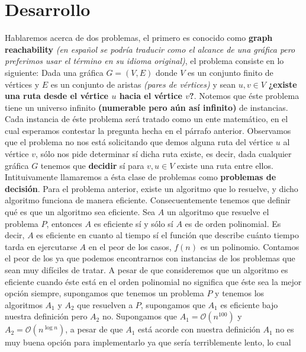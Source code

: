 \documentclass{article}
\begin{document}
\section{Desarrollo}
\noindent
Hablaremos acerca de dos problemas, el primero es conocido como \textbf{graph reachability} \textit{(en español se 
podría traducir como el alcance de una gráfica pero preferimos usar el término en su idioma original)}, el problema 
consiste en lo siguiente:
\newline 
Dada una gráfica \(G = (V, E)\) donde \(V\) es un conjunto finito de vértices y \(E\) es un conjunto de aristas 
\textit{(pares de vértices)} y sean \(u, v \in V\) \textbf{¿existe una ruta desde el vértice \(u\) hacia el vértice \(v\)?}.
\newline 
Notemos que éste problema tiene un universo infinito \textbf{(numerable pero aún así infinito)} de instancias. Cada instancia 
de éste problema será tratado como un ente matemático, en el cual esperamos contestar la pregunta hecha en el párrafo anterior. 
Observamos que el problema no nos está solicitando que demos alguna ruta del vértice \(u\)  al vértice \(v\), sólo nos pide
determinar sí dicha ruta existe, es decir, dada cualquier gráfica \(G\) tenemos que \textbf{decidir} sí para \(v, u \in V\)
existe una ruta entre ellos. Intituivamente llamaremos a ésta clase de problemas como \textbf{problemas de decisión}.
\newline 
Para el problema anterior, existe un algoritmo que lo resuelve, y dicho algoritmo funciona de manera eficiente. Consecuentemente
tenemos que definir qué es que un algoritmo sea eficiente. Sea \(A\) un algoritmo que resuelve el problema \(P\), entonces 
\(A\) es eficiente sí y sólo sí \(A\) es de orden polinomial. Es decir, \(A\) es eficiente en cuanto al tiempo sí el función que 
describe cuánto tiempo tarda en ejercutarse \(A\) en el peor de los casos, \(f(n)\) es un polinomio. Contamos el peor de los ya que 
podemos encontrarnos con instancias de los problemas que sean muy difíciles de tratar. A pesar de que consideremos que un algoritmo 
es eficiente cuando éste está en el orden polinomial no significa que éste sea la mejor opción siempre, supongamos que tenemos un problema 
\(P\) y tenemos los algoritmos \(A_{1}\) y \(A_{2}\) que resuelven a \(P\), supongamos que \(A_{1}\) es eficiente bajo nuestra definición 
pero \(A_{2}\) no. Supongamos que \(A_{1} = \mathcal{O}\left(n^{100}\right) \) y \(A_{2} = \mathcal{O}\left(n^{\log n}\right)\), a pesar de 
que \(A_{1}\) está acorde con nuestra definición \(A_{1}\) no es muy buena opción para implementarlo ya que sería terriblemente lento, lo cual 
\end{document}
